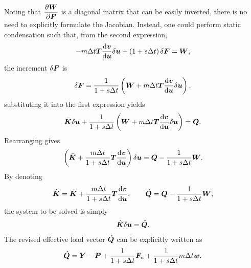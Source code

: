 Noting that $\dfrac{\partial{\bm{W}}}{\partial{\bm{F}}}$ is a diagonal matrix that can be easily inverted, there is no need to explicitly formulate the Jacobian. Instead, one could perform static condensation such that, from the second expression,
\begin{gather}
-m\Delta{}t\bm{T}\dfrac{\mathrm{d}\bm{v}}{\mathrm{d}\bm{u}}\delta\bm{u}+\left(1+s\Delta{}t\right)\delta\bm{F}=\bm{W},
\end{gather}
the increment $\delta\bm{F}$ is
\begin{gather}
\delta\bm{F}=\dfrac{1}{1+s\Delta{}t}\left(\bm{W}+m\Delta{}t\bm{T}\dfrac{\mathrm{d}\bm{v}}{\mathrm{d}\bm{u}}\delta\bm{u}\right),
\end{gather}
substituting it into the first expression yields
\begin{gather}
\bar{\bm{K}}\delta\bm{u}+\dfrac{1}{1+s\Delta{}t}\left(\bm{W}+m\Delta{}t\bm{T}\dfrac{\mathrm{d}\bm{v}}{\mathrm{d}\bm{u}}\delta\bm{u}\right)=\bm{Q}.
\end{gather}
Rearranging gives
\begin{gather}
\left(\bar{\bm{K}}+\dfrac{m\Delta{}t}{1+s\Delta{}t}\bm{T}\dfrac{\mathrm{d}\bm{v}}{\mathrm{d}\bm{u}}\right)\delta\bm{u}=\bm{Q}-\dfrac{1}{1+s\Delta{}t}\bm{W}.
\end{gather}
By denoting
\begin{gather}
\hat{\bm{K}}=\bar{\bm{K}}+\dfrac{m\Delta{}t}{1+s\Delta{}t}\bm{T}\dfrac{\mathrm{d}\bm{v}}{\mathrm{d}\bm{u}},\qquad
\hat{\bm{Q}}=\bm{Q}-\dfrac{1}{1+s\Delta{}t}\bm{W},
\end{gather}
the system to be solved is simply
\begin{gather}
\hat{\bm{K}}\delta\bm{u}=\hat{\bm{Q}}.
\end{gather}
The revised effective load vector $\hat{\bm{Q}}$ can be explicitly written as
\begin{gather}
\hat{\bm{Q}}=\bm{Y}-\bm{P}+\dfrac{1}{1+s\Delta{}t}\bm{F}_n+\dfrac{1}{1+s\Delta{}t}m\Delta{}t\bm{w}.
\end{gather}